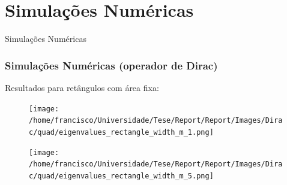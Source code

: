 \documentclass[portuguese,notheorems]{beamer}
\begin{document}
\section{Simulações Numéricas}

\begin{frame}
    \centering
    \LARGE
    Simulações Numéricas
\end{frame}

\begin{frame}\frametitle{Simulações Numéricas (operador de Dirac)}
    \centering Resultados para retângulos com área fixa:
\begin{figure}
    \centering
    \begin{minipage}{.52\textwidth}
      \centering
      \texttt{[image: /home/francisco/Universidade/Tese/Report/Report/Images/Dirac/quad/eigenvalues\_rectangle\_width\_m\_1.png]}
      \captionsetup{width=0.9\linewidth} %
    \end{minipage}%
    \begin{minipage}{.52\textwidth}
      \centering
      \texttt{[image: /home/francisco/Universidade/Tese/Report/Report/Images/Dirac/quad/eigenvalues\_rectangle\_width\_m\_5.png]}
      \captionsetup{width=0.9\linewidth} %
    \end{minipage}
\end{figure}
\end{frame}
\end{document}
